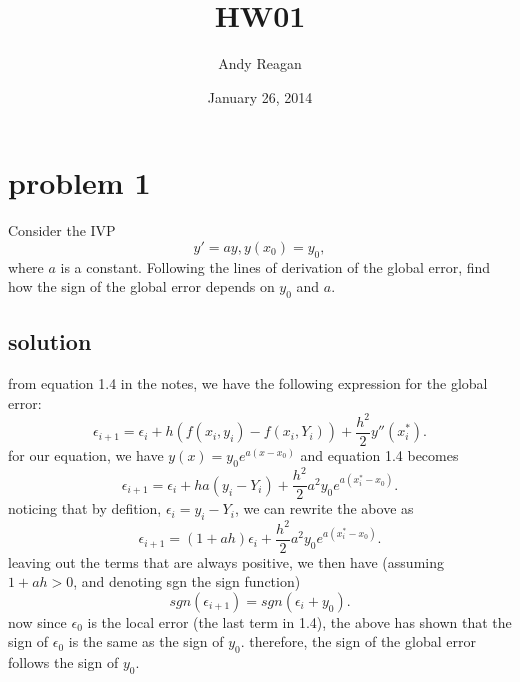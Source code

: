 \documentclass[letterpaper,10pt,english]{/Library/Python/2.7/site-packages/Sphinx-1.2-py2.7.egg/sphinx/texinputs/sphinxhowto}
\title{HW01}
\date{January 26, 2014}
\author{Andy Reagan}
\begin{document}
        
            \maketitle
        

        


        
\section{problem 1}Consider the IVP \[ y' = ay, y(x_0) = y_0,\] where $a$ is a constant.
Following the lines of derivation of the global error, find how the sign
of the global error depends on $y_0$ and $a$.\subsection{solution}from equation 1.4 in the notes, we have the following expression for the
global error:
\[ \epsilon _{i+1} = \epsilon _i + h(f(x_i,y_i)-f(x_i,Y_i))+\frac{h^2}{2} y''(x^*_i ) .\]
for our equation, we have $y(x) = y_0 e^{a(x-x_0)}$ and equation 1.4
becomes
\[ \epsilon_{i+1} = \epsilon_i + ha(y_i - Y_i) + \frac{h^2}{2} a^2 y_0 e^{a(x_i^*-x_0)} .\]
noticing that by defition, $\epsilon _i = y_i - Y_i$, we can rewrite the
above as
\[ \epsilon_{i+1} = (1+ah) \epsilon_i + \frac{h^2}{2} a^2 y_0 e^{a(x_i^*-x_0)} .\]
leaving out the terms that are always positive, we then have (assuming
$1+ah>0$, and denoting sgn the sign function)
\[ sgn(\epsilon_{i+1}) = sgn(\epsilon_i + y_0) .\] now since
$\epsilon _0$ is the local error (the last term in 1.4), the above has
shown that the sign of $\epsilon _0$ is the same as the sign of $y_0$.
therefore, the sign of the global error follows the sign of $y_0$.

\end{document}
